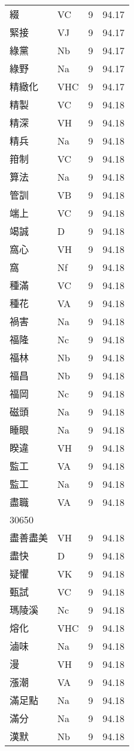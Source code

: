 \documentclass[twocolumn]{book}
\begin{document}
\begin{supertabular}{llrr}
綴 & VC & 9 &  94.17\\
緊接 & VJ & 9 &  94.17\\
綠黨 & Nb & 9 &  94.17\\
綠野 & Na & 9 &  94.17\\
精緻化 & VHC & 9 &  94.17\\
精製 & VC & 9 &  94.18\\
精深 & VH & 9 &  94.18\\
精兵 & Na & 9 &  94.18\\
箝制 & VC & 9 &  94.18\\
算法 & Na & 9 &  94.18\\
管訓 & VB & 9 &  94.18\\
端上 & VC & 9 &  94.18\\
竭誠 & D & 9 &  94.18\\
窩心 & VH & 9 &  94.18\\
窩 & Nf & 9 &  94.18\\
種滿 & VC & 9 &  94.18\\
種花 & VA & 9 &  94.18\\
禍害 & Na & 9 &  94.18\\
福隆 & Nc & 9 &  94.18\\
福林 & Nb & 9 &  94.18\\
福昌 & Nb & 9 &  94.18\\
福岡 & Nc & 9 &  94.18\\
磁頭 & Na & 9 &  94.18\\
睡眼 & Na & 9 &  94.18\\
睽違 & VH & 9 &  94.18\\
監工 & VA & 9 &  94.18\\
監工 & Na & 9 &  94.18\\
盡職 & VA & 9 &  94.18\\
30650\\
盡善盡美 & VH & 9 &  94.18\\
盡快 & D & 9 &  94.18\\
疑懼 & VK & 9 &  94.18\\
甄試 & VC & 9 &  94.18\\
瑪陵溪 & Nc & 9 &  94.18\\
熔化 & VHC & 9 &  94.18\\
滷味 & Na & 9 &  94.18\\
漫 & VH & 9 &  94.18\\
漲潮 & VA & 9 &  94.18\\
滿足點 & Na & 9 &  94.18\\
滿分 & Na & 9 &  94.18\\
漢默 & Nb & 9 &  94.18\\

\end{supertabular}
\end{document}
